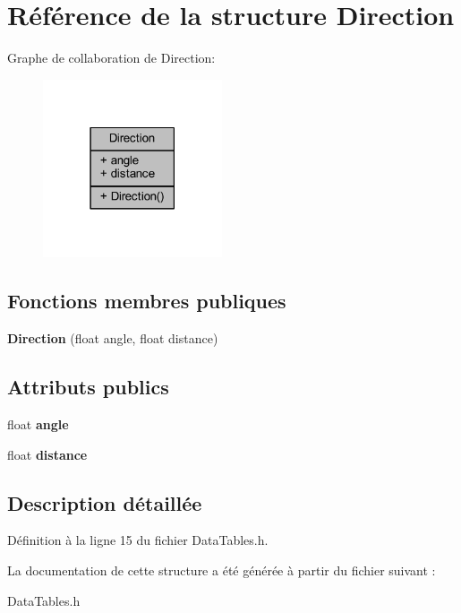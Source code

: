 \hypertarget{struct_direction}{}\section{Référence de la structure Direction}
\label{struct_direction}


Graphe de collaboration de Direction\+:\nopagebreak
\begin{figure}[H]
\begin{center}
\leavevmode
\includegraphics[width=150pt]{struct_direction__coll__graph}
\end{center}
\end{figure}
\subsection*{Fonctions membres publiques}
\begin{DoxyCompactItemize}
\item 
\hypertarget{struct_direction_ad8439f2ac8ed58d652d9f1c40e66c065}{}\label{struct_direction_ad8439f2ac8ed58d652d9f1c40e66c065} 
{\bfseries Direction} (float angle, float distance)
\end{DoxyCompactItemize}
\subsection*{Attributs publics}
\begin{DoxyCompactItemize}
\item 
\hypertarget{struct_direction_a8eaabd2d06c6274e92866814cfb6a2ea}{}\label{struct_direction_a8eaabd2d06c6274e92866814cfb6a2ea} 
float {\bfseries angle}
\item 
\hypertarget{struct_direction_a6cf81244bffe43d4b4d1bc8a3f63772a}{}\label{struct_direction_a6cf81244bffe43d4b4d1bc8a3f63772a} 
float {\bfseries distance}
\end{DoxyCompactItemize}


\subsection{Description détaillée}


Définition à la ligne 15 du fichier Data\+Tables.\+h.



La documentation de cette structure a été générée à partir du fichier suivant \+:\begin{DoxyCompactItemize}
\item 
Data\+Tables.\+h\end{DoxyCompactItemize}
